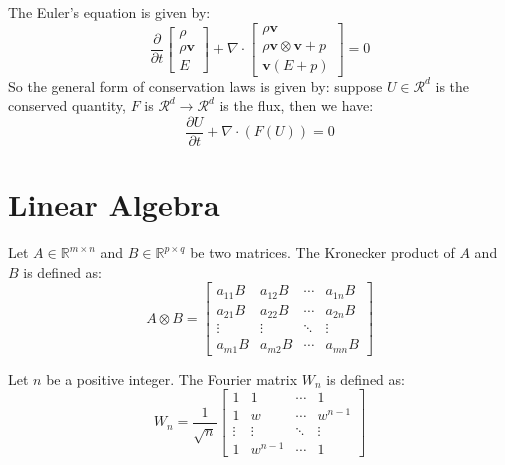 \begin{theorem}
    The Euler's equation is given by:
    \begin{equation}
        \frac{\partial}{\partial t}\begin{bmatrix}
        \rho\\ \rho \mathbf{v}\\E
    \end{bmatrix}
    + \nabla\cdot \begin{bmatrix}
        \rho \mathbf{v}\\ \rho \mathbf{v}\otimes \mathbf{v} + p\\ \mathbf{v}(E + p)
    \end{bmatrix} = 0
\end{equation}
So the general form of conservation laws is given by: suppose $U\in \mathcal{R}^d$ is the conserved quantity, $F$ is $\mathcal{R}^d\to \mathcal{R}^d$ is the flux, 
then we have:
\begin{equation}
    \frac{\partial U}{\partial t} + \nabla\cdot \left(F(U)\right) = 0
\end{equation}

\section{Linear Algebra}
\begin{definition}
    Let $A\in \mathbb{R}^{m\times n}$ and $B\in \mathbb{R}^{p\times q}$ be two matrices. The Kronecker product of $A$ and $B$ is defined as:
    \begin{equation}
        A\otimes B = \begin{bmatrix}
            a_{11}B & a_{12}B & \cdots & a_{1n}B\\
            a_{21}B & a_{22}B & \cdots & a_{2n}B\\
            \vdots & \vdots & \ddots & \vdots\\
            a_{m1}B & a_{m2}B & \cdots & a_{mn}B
        \end{bmatrix}
    \end{equation}
\end{definition}

\begin{definition}
    Let $n$ be a positive integer. The Fourier matrix $W_n$ is defined as:
    \begin{equation}
        W_n = \frac{1}{\sqrt{n}}\begin{bmatrix}
            1 & 1 & \cdots & 1\\
            1 & w & \cdots & w^{n-1}\\
            \vdots & \vdots & \ddots & \vdots\\
            1 & w^{n-1} & \cdots & 1
        \end{bmatrix}
    \end{equation}
\end{definition}


\end{theorem}
